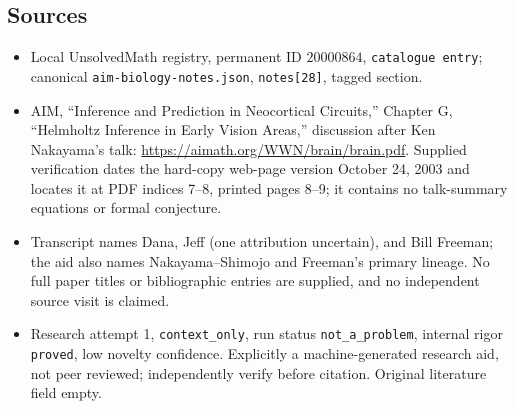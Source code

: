 \documentclass[11pt]{article}
\begin{document}
\subsection{Sources}
\begin{itemize}
\item Local UnsolvedMath registry, permanent ID $20000864$, \texttt{catalogue entry}; canonical \texttt{aim-biology-notes.json}, \texttt{notes[28]}, tagged section.
\item AIM, ``Inference and Prediction in Neocortical Circuits,'' Chapter G, ``Helmholtz Inference in Early Vision Areas,'' discussion after Ken Nakayama's talk: \url{https://aimath.org/WWN/brain/brain.pdf}. Supplied verification dates the hard-copy web-page version October 24, 2003 and locates it at PDF indices 7--8, printed pages 8--9; it contains no talk-summary equations or formal conjecture.
\item Transcript names Dana, Jeff (one attribution uncertain), and Bill Freeman; the aid also names Nakayama--Shimojo and Freeman's primary lineage. No full paper titles or bibliographic entries are supplied, and no independent source visit is claimed.
\item Research attempt 1, \texttt{context\_only}, run status \texttt{not\_a\_problem}, internal rigor \texttt{proved}, low novelty confidence. Explicitly a machine-generated research aid, not peer reviewed; independently verify before citation. Original literature field empty.
\end{itemize}
\end{document}
